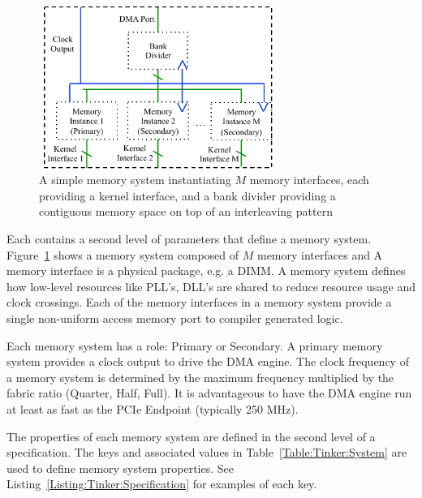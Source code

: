\documentclass{refrep}
\newcommand{\TODO}[1]{\textbf{\color{red}{#1}}}
\newcommand{\Keyword}[1]{\textbf{\color{BlueViolet}{#1}}}
\newcommand{\Subst}[1]{\textbf{\textless{#1}\textgreater}}
\begin{document}
\begin{figure}[h]
\centering
\includegraphics[width=3in]{OpenCLMemorySystem.pdf}
\caption{A simple memory system instantiating $M$ memory interfaces, each
  providing a kernel interface, and a bank divider providing a contiguous memory
  space on top of an interleaving pattern}
\label{Fig:Tinker:MemSys}
\end{figure}

Each \Keyword{\Subst{System ID}} contains a second level of parameters that
define a memory system. Figure~\ref{Fig:Tinker:MemSys} shows a memory system
composed of $M$ memory interfaces and A memory interface is a physical package,
e.g. a DIMM. A memory system defines how low-level resources like PLL's, DLL's
are shared to reduce resource usage and clock crossings. Each of the memory
interfaces in a memory system provide a single non-uniform access memory port to
compiler generated logic.

Each memory system has a role: Primary or Secondary. A primary memory system
provides a clock output to drive the DMA engine. The clock frequency of a memory
system is determined by the maximum frequency multiplied by the fabric ratio
(Quarter, Half, Full). It is advantageous to have the DMA engine run at least as
fast as the PCIe Endpoint (typically 250 MHz). \TODO{Change to Quarter, half, full}

The properties of each memory system are defined in the second level of a
specification. The keys and associated values in Table~\ref{Table:Tinker:System}
are used to define memory system properties. See
Listing~\ref{Listing:Tinker:Specification} for examples of each key.
\end{document}
